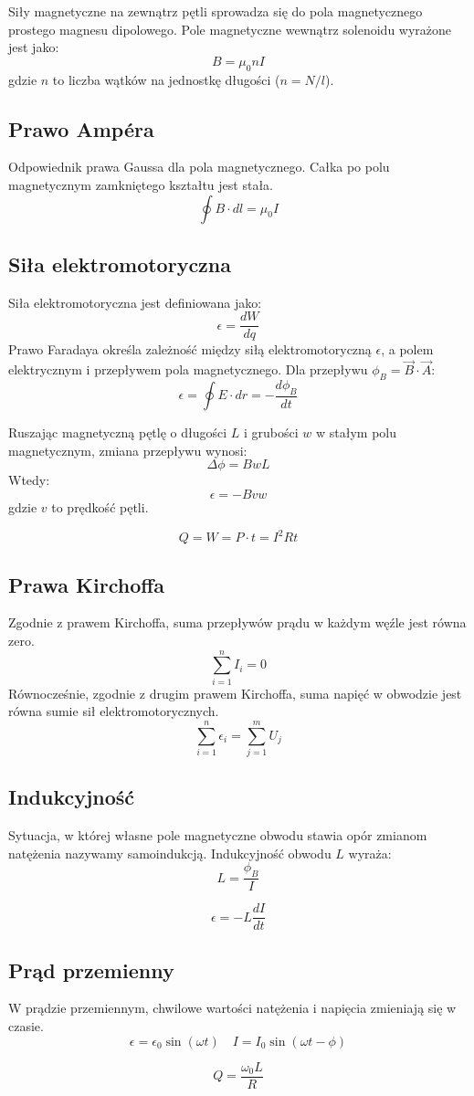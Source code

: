 \documentclass{../notatki}
\begin{document}
Siły magnetyczne na zewnątrz pętli sprowadza się do pola magnetycznego
prostego magnesu dipolowego. Pole magnetyczne wewnątrz solenoidu wyrażone jest
jako:
$$
B = \mu_0 nI
$$
gdzie $n$ to liczba wątków na jednostkę długości ($n = N/l$).

\subsection{Prawo Ampéra}

Odpowiednik prawa Gaussa dla pola magnetycznego. Całka po polu magnetycznym
zamkniętego kształtu jest stała.
$$
\oint B \cdot dl = \mu_0 I
$$

\subsection{Siła elektromotoryczna}

Siła elektromotoryczna jest definiowana jako:
$$
\epsilon = \frac{dW}{dq}
$$
Prawo Faradaya określa zależność między siłą elektromotoryczną
$\epsilon$, a polem elektrycznym i przepływem pola magnetycznego. Dla
przepływu $\phi_B = \vec{B} \cdot \vec{A}$:
$$\epsilon = \oint E \cdot dr = -
\frac{d \phi_B}{dt}$$

Ruszając magnetyczną pętlę o długości $L$ i grubości $w$ w stałym
polu magnetycznym, zmiana przepływu wynosi:
$$
\Delta \phi = BwL
$$
Wtedy:
$$
\epsilon = - Bvw
$$
gdzie $v$ to prędkość pętli.

$$
Q = W = P \cdot t = I^2 Rt
$$

\subsection{Prawa Kirchoffa}

Zgodnie z prawem Kirchoffa, suma przepływów prądu w każdym węźle jest
równa zero.
$$
\sum_{i=1}^{n} I_i = 0
$$
Równocześnie, zgodnie z drugim prawem Kirchoffa, suma napięć w obwodzie
jest równa sumie sił elektromotorycznych.
$$
\sum_{i=1}^{n} \epsilon_i = \sum_{j=1}^{m} U_j
$$

\subsection{Indukcyjność}

Sytuacja, w której własne pole magnetyczne obwodu stawia opór zmianom
natężenia nazywamy samoindukcją. Indukcyjność obwodu $L$ wyraża:
$$
L = \frac{\phi_B}{I}
$$

$$
\epsilon = - L \frac{dI}{dt}
$$

\subsection{Prąd przemienny}

W prądzie przemiennym, chwilowe wartości natężenia i napięcia
zmieniają się w czasie.
$$
\epsilon = \epsilon_0 \sin(\omega t) \quad I = I_0 \sin(\omega t - \phi)
$$

$$
Q = \frac{\omega_0 L}{R}
$$
\end{document}
